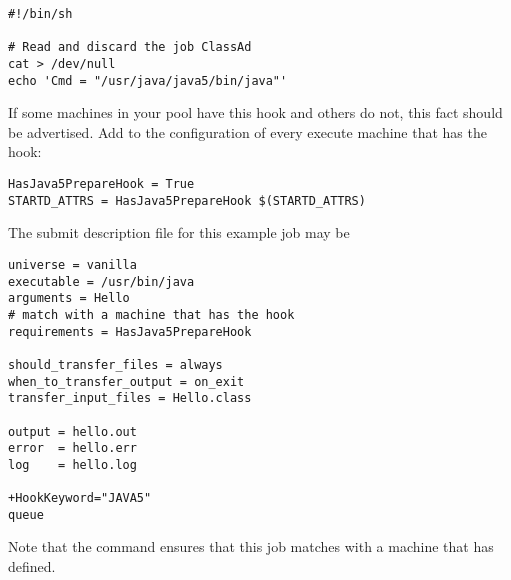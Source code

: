 \begin{verbatim}
#!/bin/sh

# Read and discard the job ClassAd
cat > /dev/null
echo 'Cmd = "/usr/java/java5/bin/java"'
\end{verbatim}

If some machines in your pool have this hook and others do not,
this fact should be advertised.
Add to the configuration of every execute machine that has the hook:

\begin{verbatim}
HasJava5PrepareHook = True
STARTD_ATTRS = HasJava5PrepareHook $(STARTD_ATTRS)
\end{verbatim}

The submit description file for this example job may be
\footnotesize
\begin{verbatim}
universe = vanilla
executable = /usr/bin/java
arguments = Hello
# match with a machine that has the hook
requirements = HasJava5PrepareHook

should_transfer_files = always
when_to_transfer_output = on_exit
transfer_input_files = Hello.class

output = hello.out
error  = hello.err
log    = hello.log

+HookKeyword="JAVA5"
queue

\end{verbatim}
\normalsize
Note that the  command ensures that this job
matches with a machine that has  defined.

